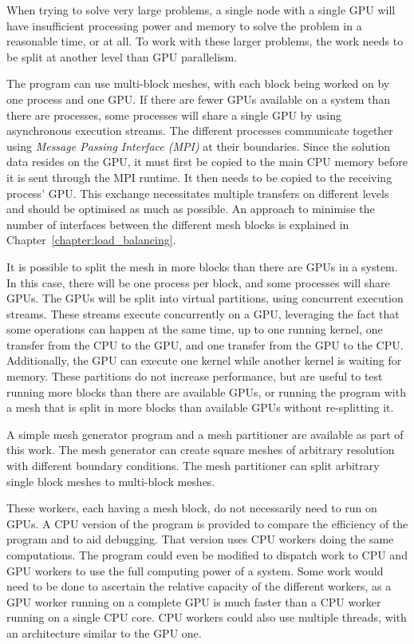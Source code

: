 When trying to solve very large problems, a single node with a single GPU will have insufficient
processing power and memory to solve the problem in a reasonable time, or at all. To work with these
larger problems, the work needs to be split at another level than GPU parallelism.  

The program can use multi-block meshes, with each block being worked on by one process and one GPU.
If there are fewer GPUs available on a system than there are processes, some processes will share a
single GPU by using asynchronous execution streams. The different processes communicate together
using \textit{Message Passing Interface (MPI)} at their boundaries. Since the solution data resides
on the GPU, it must first be copied to the main CPU memory before it is sent through the MPI
runtime. It then needs to be copied to the receiving process' GPU. This exchange necessitates
multiple transfers on different levels and should be optimised as much as possible. An approach to
minimise the number of interfaces between the different mesh blocks is explained in
Chapter~\ref{chapter:load_balancing}. 

It is possible to split the mesh in more blocks than there are GPUs in a system. In this case, there
will be one process per block, and some processes will share GPUs. The GPUs will be split into
virtual partitions, using concurrent execution streams. These streams execute concurrently on a GPU,
leveraging the fact that some operations can happen at the same time, up to one running kernel, one
transfer from the CPU to the GPU, and one transfer from the GPU to the CPU. Additionally, the GPU
can execute one kernel while another kernel is waiting for memory. These partitions do not increase
performance, but are useful to test running more blocks than there are available GPUs, or running
the program with a mesh that is split in more blocks than available GPUs without re-splitting it.

A simple mesh generator program and a mesh partitioner are available as part of this work. The mesh
generator can create square meshes of arbitrary resolution with different boundary conditions. The
mesh partitioner can split arbitrary single block meshes to multi-block meshes.

These workers, each having a mesh block, do not necessarily need to run on GPUs. A CPU version of
the program is provided to compare the efficiency of the program and to aid debugging. That version
uses CPU workers doing the same computations. The program could even be modified to dispatch work to
CPU and GPU workers to use the full computing power of a system. Some work would need to be done to
ascertain the relative capacity of the different workers, as a GPU worker running on a complete GPU
is much faster than a CPU worker running on a single CPU core. CPU workers could also use multiple
threads, with an architecture similar to the GPU one.

